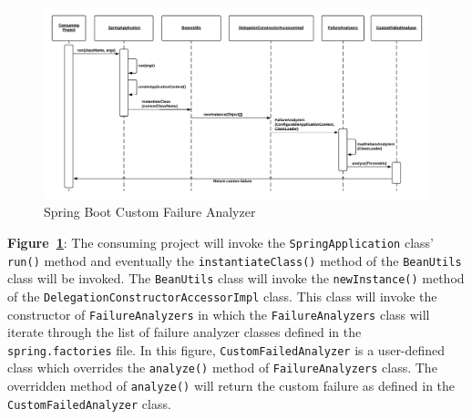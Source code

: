 \begin{figure}[H]
    \centering
    \includegraphics[width=\textwidth, height=\textheight, keepaspectratio]{content/architectural-views-top-level/custom-failure-analyzer.png}
    \caption{Spring Boot Custom Failure Analyzer}
    \label{sequence-diagram-custom-failure-analyzer}
\end{figure}

\textbf{Figure~\ref{sequence-diagram-custom-failure-analyzer}}: The consuming project will invoke the \texttt{SpringApplication} class' \texttt{run()} method and eventually the \texttt{instantiateClass()} method of the \texttt{BeanUtils} class will be invoked. The \texttt{BeanUtils} class will invoke the \texttt{newInstance()} method of the \texttt{DelegationConstructorAccessorImpl} class. This class will invoke the constructor of \texttt{FailureAnalyzers} in which the \texttt{FailureAnalyzers} class will iterate through the list of failure analyzer classes defined in the \texttt{spring.factories} file. In this figure, \texttt{CustomFailedAnalyzer} is a user-defined class which overrides the \texttt{analyze()} method of \texttt{FailureAnalyzers} class. The overridden method of \texttt{analyze()} will return the custom failure as defined in the \texttt{CustomFailedAnalyzer} class.
